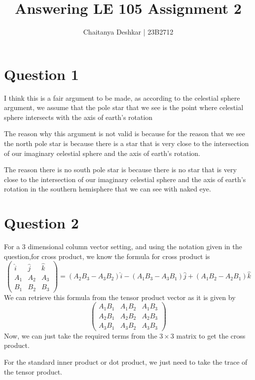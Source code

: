 \documentclass{article}
\title{Answering LE 105 Assignment 2}
\author{Chaitanya Deshkar | 23B2712}
\begin{document}
\maketitle

\section*{Question 1}
I think this is a fair argument to be made, as according to the celestial sphere argument, 
we assume that the pole star that we see is the point where celestial sphere intersects with the axis of earth's rotation

The reason why this argument is not valid is because for the reason that we see the north pole star is because 
there is a star that is very close to the intersection of our imaginary celestial sphere and the axis of earth's rotation. 

The reason there is no south pole star is because there is no star that is very close to the intersection of our imaginary celestial sphere and the axis of earth's rotation in the southern hemisphere that we can see with naked eye.


\section*{Question 2}
For a 3 dimensional column vector setting, and using the notation given in the question,for cross product, we know the formula for cross product is 
\[\begin{pmatrix}
\hat{i} & \hat{j} & \hat{k} \\
A_1 & A_2 & A_3 \\
B_1 & B_2 & B_3
\end{pmatrix} = 
(A_2B_3 - A_3B_2) \hat{i} -
(A_1B_3 - A_3B_1) \hat{j} +
(A_1B_2 - A_2B_1) \hat{k}\]
We can retrieve this formula from the tensor product vector as it is given by
\[\begin{pmatrix}
A_1B_1 & A_1B_2 & A_1B_3 \\
A_2B_1 & A_2B_2 & A_2B_3 \\
A_3B_1 & A_3B_2 & A_3B_3
\end{pmatrix}\]
Now, we can just take the required terms from the \(3 \times 3\) matrix to get the cross product.

For the standard inner product or dot product, we just need to take the trace of the tensor product.
\end{document}
